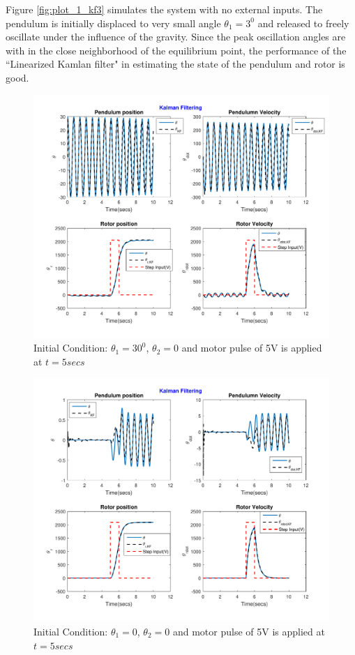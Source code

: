 \documentclass[a4paper]{article}
\begin{document}
Figure \ref{fig:plot_1_kf3} simulates the system with no external inputs. The pendulum is initially displaced to very small angle $\theta_1 = 3^0$ and released to freely oscillate under the influence of the gravity. Since the peak oscillation angles are with in the close neighborhood of the equilibrium point, the performance of the ``Linearized Kamlan filter" in estimating the state of the pendulum and rotor is good.    
\begin{figure}
\centering
\includegraphics[width=0.7\linewidth]{fig/plot_1_kf1}
\caption{Initial Condition: $\theta_1 = 30^0$, $\theta_2 = 0$ and motor pulse of 5V is applied at $t = 5secs$}
\label{fig:plot_1_kf1}
\end{figure}
\begin{figure}
\centering
\includegraphics[width=0.7\linewidth]{fig/plot_1_kf2}
\caption{Initial Condition: $\theta_1 = 0$, $\theta_2 = 0$ and motor pulse of 5V is applied at $t = 5secs$}
\label{fig:plot_1_kf2}
\end{figure}
\end{document}
